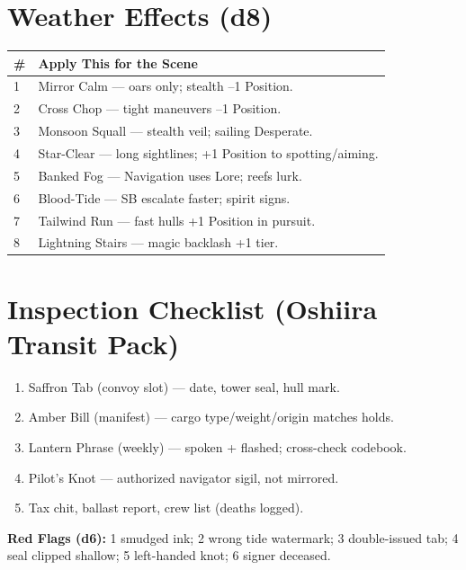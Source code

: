 \documentclass[11pt,oneside]{book}
\begin{document}
\begin{itemize}
\section*{Weather Effects (d8)}
\begin{tabularx}{\linewidth}{@{}p{0.7cm} X@{}}
\toprule
\# & \textbf{Apply This for the Scene}\\
\midrule
1 & Mirror Calm --- oars only; stealth --1 Position.\\
2 & Cross Chop --- tight maneuvers --1 Position.\\
3 & Monsoon Squall --- stealth veil; sailing Desperate.\\
4 & Star-Clear --- long sightlines; +1 Position to spotting/aiming.\\
5 & Banked Fog --- Navigation uses Lore; reefs lurk.\\
6 & Blood-Tide --- SB escalate faster; spirit signs.\\
7 & Tailwind Run --- fast hulls +1 Position in pursuit.\\
8 & Lightning Stairs --- magic backlash +1 tier.\\
\bottomrule
\end{tabularx}

\section*{Inspection Checklist (Oshiira Transit Pack)}
\begin{enumerate}[leftmargin=*,itemsep=2pt]
  \item Saffron Tab (convoy slot) --- date, tower seal, hull mark.
  \item Amber Bill (manifest) --- cargo type/weight/origin matches holds.
  \item Lantern Phrase (weekly) --- spoken + flashed; cross-check codebook.
  \item Pilot's Knot --- authorized navigator sigil, not mirrored.
  \item Tax chit, ballast report, crew list (deaths logged).
\end{enumerate}
\noindent \textbf{Red Flags (d6):} 1 smudged ink; 2 wrong tide watermark; 3 double-issued tab; 4 seal clipped shallow; 5 left-handed knot; 6 signer deceased.


\end{itemize}
\end{document}
